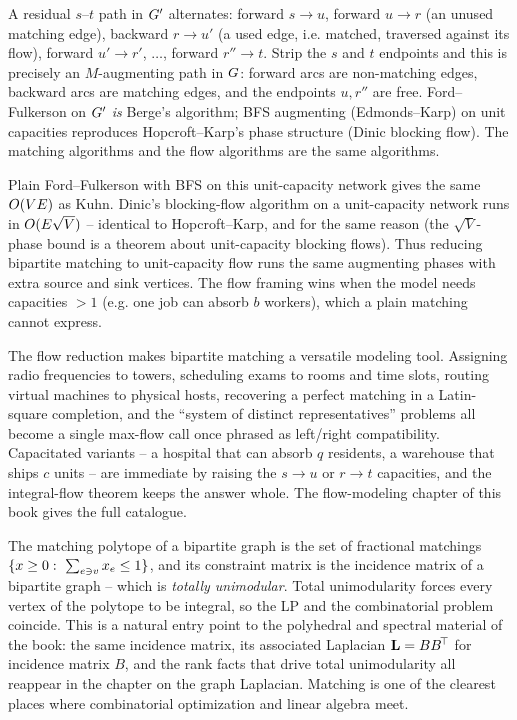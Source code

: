 \begin{whybox}
A residual $s$--$t$ path in $G'$ alternates: forward $s\to u$, forward $u\to r$
(an unused matching edge), backward $r\to u'$ (a used edge, i.e. matched,
traversed against its flow), forward $u'\to r'$, $\dots$, forward $r''\to t$.
Strip the $s$ and $t$ endpoints and this is precisely an $M$-augmenting path in
$G$: forward arcs are non-matching edges, backward arcs are matching edges,
and the endpoints $u,r''$ are free. Ford--Fulkerson on $G'$ \emph{is} Berge's
algorithm; BFS augmenting (Edmonds--Karp) on unit capacities reproduces
Hopcroft--Karp's phase structure (Dinic blocking flow). The matching algorithms
and the flow algorithms are the same algorithms.
\end{whybox}

\begin{complexitybox}
Plain Ford--Fulkerson with BFS on this unit-capacity network gives the same
$O(VE)$ as Kuhn. Dinic's blocking-flow algorithm on a unit-capacity network
runs in $O(E\sqrt{V})$ -- identical to Hopcroft--Karp, and for the same reason
(the $\sqrt{V}$-phase bound is a theorem about unit-capacity blocking flows). Thus
reducing bipartite matching to unit-capacity flow runs the same augmenting phases with extra source and
sink vertices. The flow framing wins when the model needs capacities $>1$
(e.g. one job can absorb $b$ workers), which a plain matching cannot express.
\end{complexitybox}

\begin{applicationbox}
The flow reduction makes bipartite matching a versatile modeling tool.
Assigning radio frequencies to towers, scheduling exams to rooms and time slots,
routing virtual machines to physical hosts, recovering a perfect matching in a
Latin-square completion, and the ``system of distinct representatives'' problems
all become a single max-flow call once phrased as left/right compatibility.
Capacitated variants -- a hospital that can absorb $q$ residents, a warehouse
that ships $c$ units -- are immediate by raising the $s\to u$ or $r\to t$
capacities, and the integral-flow theorem keeps the answer whole. The
flow-modeling chapter of this book gives the full catalogue.
\end{applicationbox}

\begin{connectionbox}
The matching polytope of a bipartite graph is the set of fractional matchings
$\{x\ge 0:\ \sum_{e\ni v}x_e\le 1\}$, and its constraint matrix is the
incidence matrix of a bipartite graph -- which is \emph{totally unimodular}. Total
unimodularity forces every vertex of the polytope to be integral, so the LP and
the combinatorial problem coincide. This is a natural entry point to the
polyhedral and spectral material of the book: the same incidence matrix, its
associated Laplacian $\mathbf{L}=BB^{\!\top}$ for incidence matrix $B$, and the rank
facts that drive total unimodularity all reappear in the chapter on the graph
Laplacian. Matching is one of the clearest places where combinatorial optimization
and linear algebra meet.
\end{connectionbox}

